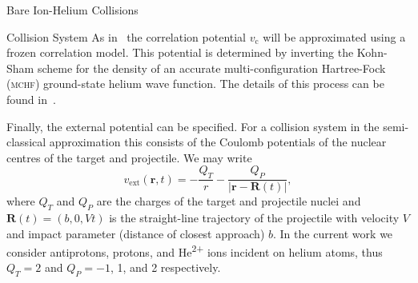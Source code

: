 \documentclass[letterpaper, 11 pt]{report}
\begin{document}
\begin{chapter}{Bare Ion-Helium Collisions \label{chap:p-he2p-he}}
\begin{section}{Collision System \label{sec:p-he2p-he-sys}}
      As in~\cite{pbarhe} the correlation potential $v_\mathrm{c}$ will be approximated using a frozen
      correlation model. This potential is determined by inverting the Kohn-Sham scheme for the density
      of an accurate multi-configuration Hartree-Fock~\cite{mchf} (\textsc{mchf}) ground-state helium
      wave function. The details of this process can be found in~\cite{thesis, pbarhe}.

      Finally, the external potential can be specified. For a collision system in the semi-classical
      approximation this consists of the Coulomb potentials of the nuclear centres of the target and
      projectile. We may write
      \begin{equation} \label{eq:phe2p-ext}
         v_\mathrm{ext}(\mathbf{r},t) = -\frac{Q_T}{r}
         - \frac{Q_P}{\left| \mathbf{r} - \mathbf{R}(t) \right|},
      \end{equation}
      where $Q_T$ and $Q_P$ are the charges of the target and projectile nuclei and
      $\mathbf{R}(t) = (b,0,V t)$ is the straight-line trajectory of the projectile with velocity $V$ and
      impact parameter (distance of closest approach) $b$. In the current work we consider antiprotons,
      protons, and He\textsuperscript{2+} ions incident on helium atoms, thus $Q_T = 2$ and
      $Q_P = -1$, 1, and 2 respectively.


\end{section}
\end{chapter}
\end{document}
